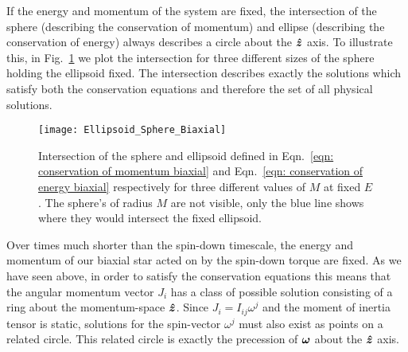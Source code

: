 \documentclass[../full_thesis/full_thesis.tex]{subfiles}
\begin{document}
If the energy and momentum of the system are fixed, the intersection of the
sphere (describing the conservation of momentum) and ellipse (describing the
conservation of energy) always describes a circle about the $\boldsymbol{\hat{z}}$ axis. To illustrate
this, in Fig.~\ref{fig: plot sphere ellipse biaxial} we plot the intersection
for three different sizes of the sphere holding the ellipsoid fixed. The
intersection describes exactly the solutions which satisfy both the conservation
equations and therefore the set of all physical solutions. 
\begin{figure}[ht]
\centering
\texttt{[image: Ellipsoid\_Sphere\_Biaxial]}
\caption{Intersection of the sphere and ellipsoid defined in Eqn.~\eqref{eqn:
conservation of momentum biaxial} and Eqn.~\eqref{eqn: conservation of energy
biaxial} respectively for three different values of $M$ at
fixed $E$. The sphere's of radius $M$ are not visible, only the blue line shows
where they would intersect the fixed ellipsoid.}
\label{fig: plot sphere ellipse biaxial}
\end{figure}

Over times much shorter than the spin-down timescale, the energy and momentum
of our biaxial star acted on by the spin-down torque are fixed. As we have seen
above, in order to satisfy the conservation equations this means that the
angular momentum vector $J_i$ has a class of possible solution consisting of a
ring about the momentum-space $\boldsymbol{\hat{z}}$.  Since $J_{i}=I_{ij}\omega^{j}$ and the
moment of inertia tensor is static, solutions for the spin-vector $\omega^j$
must also exist as points on a related circle. This related circle is exactly
the precession of $\boldsymbol{\omega}$ about the $\boldsymbol{\hat{z}}$ axis.
\end{document}
